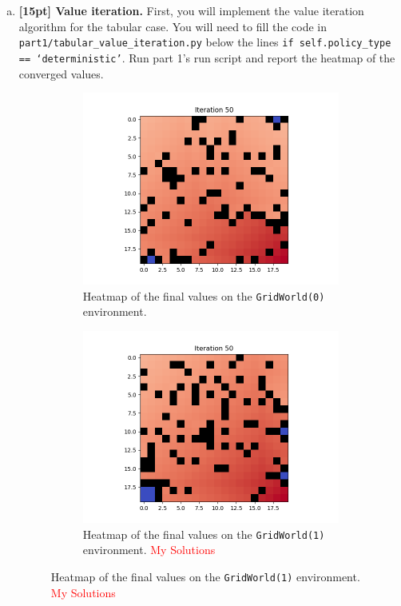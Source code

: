 \documentclass{article}
\begin{document}
\begin{enumerate}[(a)]

\item {\bf [15pt] Value iteration.} First, you will implement the value iteration algorithm for the tabular case. You will need to fill the code in \texttt{part1/tabular\_value\_iteration.py} below the lines \texttt{if self.policy\_type == `deterministic'}. Run part 1's run script and report the heatmap of the converged values.

\begin{figure}[h!]
    \centering
    \begin{subfigure}{0.45\textwidth}
        \centering
        \includegraphics[width=\textwidth]{figures/part_1_a.png}
        \caption{Heatmap of the final values on the \texttt{GridWorld(0)} environment.}
    \end{subfigure}
    \hspace{0.2in}
    \begin{subfigure}{0.45\textwidth}
        \centering
        \includegraphics[width=\textwidth]{figures/part_1_a_grid1.png}
        \caption{Heatmap of the final values on the \texttt{GridWorld(1)} environment.  \textcolor{red}{My Solutions}}
    \end{subfigure}
\end{figure}


\end{enumerate}
\end{document}

